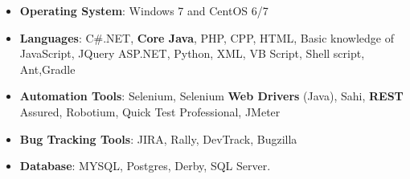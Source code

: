 \begin{cvparagraph}
\begin{itemize}
\item {\textbf{Operating System}: Windows 7 and CentOS 6/7}
\item {\textbf{Languages}: C\#.NET, \textbf{Core Java}, PHP, CPP, HTML, Basic knowledge of JavaScript, JQuery ASP.NET, Python, XML, VB Script, Shell script, Ant,Gradle}
\item {\textbf{Automation  Tools}: Selenium, Selenium \textbf{Web Drivers} (Java), Sahi, \textbf{REST} Assured, Robotium, Quick Test Professional, JMeter}
\item {\textbf{Bug Tracking Tools}: JIRA, Rally, DevTrack, Bugzilla }
\item {\textbf{Database}: MYSQL, Postgres, Derby, SQL Server.}
\end{itemize}
\end{cvparagraph}